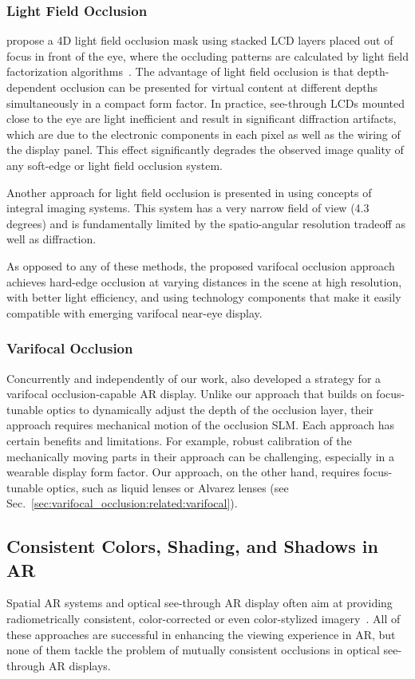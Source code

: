 \subsubsection{Light Field Occlusion}
\citet{maimone2013computational} propose a 4D light field occlusion mask using stacked LCD layers placed out of focus in front of the eye, where the occluding patterns are calculated by light field factorization algorithms~\cite{Lanman2010, Wetzstein2012}. 
The advantage of light field occlusion is that depth-dependent occlusion can be presented for virtual content at different depths simultaneously in a compact form factor. 
In practice, see-through LCDs mounted close to the eye are light inefficient and result in significant diffraction artifacts, which are due to the electronic components in each pixel as well as the wiring of the display panel. This effect significantly degrades the observed image quality of any soft-edge or light field occlusion system. 

Another approach for light field occlusion is presented in \citet{Yamaguchi2016} using concepts of integral imaging systems. This system has a very narrow field of view (4.3 degrees) and is fundamentally limited by the spatio-angular resolution tradeoff as well as diffraction.

As opposed to any of these methods, the proposed varifocal occlusion approach achieves hard-edge occlusion at varying distances in the scene at high resolution, with better light efficiency, and using technology components that make it easily compatible with emerging varifocal near-eye display. 

\subsubsection{Varifocal Occlusion}
Concurrently and independently of our work, \citet{Hamasaki2019} also developed a strategy for a varifocal occlusion-capable AR display. 
Unlike our approach that builds on focus-tunable optics to dynamically adjust the depth of the occlusion layer, their approach requires mechanical motion of the occlusion SLM. 
Each approach has certain benefits and limitations. 
For example, robust calibration of the mechanically moving parts in their approach can be challenging, especially in a wearable display form factor. 
Our approach, on the other hand, requires focus-tunable optics, such as liquid lenses or Alvarez lenses (see Sec.~\ref{sec:varifocal_occlusion:related:varifocal}).

\subsection{Consistent Colors, Shading, and Shadows in AR}
Spatial AR systems and optical see-through AR display often aim at providing radiometrically consistent, color-corrected or even color-stylized imagery~\cite{Bimber:2008,Wetzstein2010,Langlotz:2016,Langlotz2018,Itoh2019}. 
All of these approaches are successful in enhancing the viewing experience in AR, but none of them tackle the problem of mutually consistent occlusions in optical see-through AR displays.
